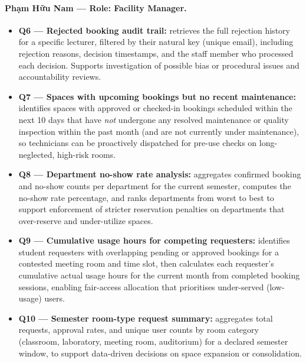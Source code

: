 \paragraph{Phạm Hữu Nam --- Role: Facility Manager.}
\begin{itemize}[noitemsep]
    \item \textbf{Q6 --- Rejected booking audit trail:} retrieves the full
    rejection history for a specific lecturer, filtered by their natural
    key (unique email), including rejection reasons, decision timestamps,
    and the staff member who processed each decision. Supports
    investigation of possible bias or procedural issues and accountability
    reviews.

    \item \textbf{Q7 --- Spaces with upcoming bookings but no recent
    maintenance:} identifies spaces with approved or checked-in bookings
    scheduled within the next 10 days that have \emph{not} undergone any
    resolved maintenance or quality inspection within the past month (and
    are not currently under maintenance), so technicians can be
    proactively dispatched for pre-use checks on long-neglected,
    high-risk rooms.

    \item \textbf{Q8 --- Department no-show rate analysis:} aggregates
    confirmed booking and no-show counts per department for the current
    semester, computes the no-show rate percentage, and ranks departments
    from worst to best to support enforcement of stricter reservation
    penalties on departments that over-reserve and under-utilize spaces.

    \item \textbf{Q9 --- Cumulative usage hours for competing requesters:}
    identifies student requesters with overlapping pending or approved
    bookings for a contested meeting room and time slot, then calculates
    each requester's cumulative actual usage hours for the current month
    from completed booking sessions, enabling fair-access allocation that
    prioritises under-served (low-usage) users.

    \item \textbf{Q10 --- Semester room-type request summary:} aggregates
    total requests, approval rates, and unique user counts by room
    category (classroom, laboratory, meeting room, auditorium) for a
    declared semester window, to support data-driven decisions on space
    expansion or consolidation.
\end{itemize}
